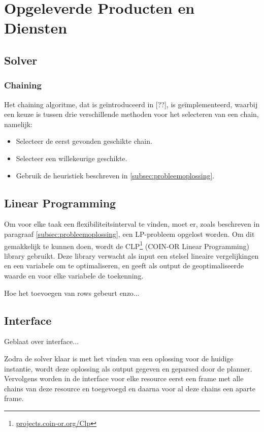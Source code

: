 \section{Opgeleverde Producten en Diensten}

\subsection{Solver}

\subsubsection*{Chaining}
Het chaining algoritme, dat is ge\"introduceerd in [??], is ge\"implementeerd, waarbij een keuze is tussen drie verschillende methoden voor het selecteren van een chain, namelijk:
\begin{itemize}
\item Selecteer de eerst gevonden geschikte chain.
\item Selecteer een willekeurige geschikte.
\item Gebruik de heuristiek beschreven in \ref{subsec:probleemoplossing}.
\end{itemize}

\subsection*{Linear Programming}
Om voor elke taak een flexibiliteitsinterval te vinden, moet er, zoals beschreven in paragraaf \ref{subsec:probleemoplossing}, een LP-probleem opgelost worden. Om dit gemakkelijk te kunnen doen, wordt de CLP\footnote{\href{https://projects.coin-or.org/Clp}{projects.coin-or.org/Clp}} (COIN-OR Linear Programming) library gebruikt. Deze library verwacht als input een stelsel lineaire vergelijkingen en een variabele om te optimaliseren, en geeft als output de geoptimaliseerde waarde en voor elke variabele de toekenning.

Hoe het toevoegen van rows gebeurt enzo...

\subsection{Interface}
Geblaat over interface...

Zodra de solver klaar is met het vinden van een oplossing voor de huidige instantie, wordt deze oplossing als output gegeven en geparsed door de planner. Vervolgens worden in de interface voor elke resource eerst een frame met alle chains van deze resource en toegevoegd en daarna voor al deze chains een aparte frame.

